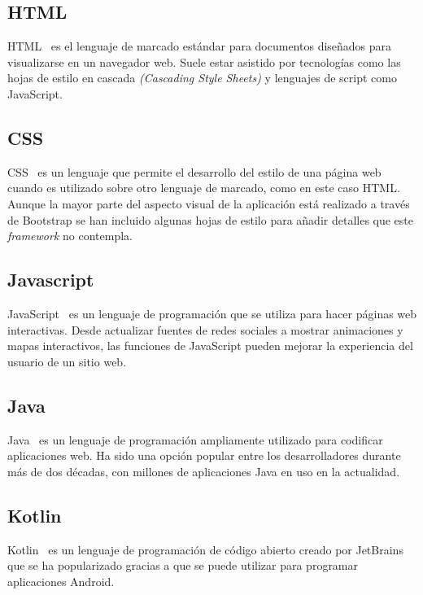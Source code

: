\subsection{HTML}

HTML~\citep{html} es el lenguaje de marcado estándar para documentos diseñados para visualizarse en un navegador web. Suele estar asistido por tecnologías como las hojas de estilo en cascada \textit{(Cascading Style Sheets)} y lenguajes de script como JavaScript.

\subsection{CSS}

CSS~\citep{css} es un lenguaje que permite el desarrollo del estilo de una página web cuando es utilizado sobre otro lenguaje de marcado, como en este caso HTML. Aunque la mayor parte del aspecto visual de la aplicación está realizado a través de Bootstrap se han incluido algunas hojas de estilo para añadir detalles que este \textit{framework} no contempla.

\subsection{Javascript}

JavaScript~\citep{javascript} es un lenguaje de programación que se utiliza para hacer páginas web interactivas. Desde actualizar fuentes de redes sociales a mostrar animaciones y mapas interactivos, las funciones de JavaScript pueden mejorar la experiencia del usuario de un sitio web.

\subsection{Java}

Java~\citep{java} es un lenguaje de programación ampliamente utilizado para codificar aplicaciones web. Ha sido una opción popular entre los desarrolladores durante más de dos décadas, con millones de aplicaciones Java en uso en la actualidad.

\subsection{Kotlin}

Kotlin~\citep{kotlin} es un lenguaje de programación de código abierto creado por JetBrains que se ha popularizado gracias a que se puede utilizar para programar aplicaciones Android.


